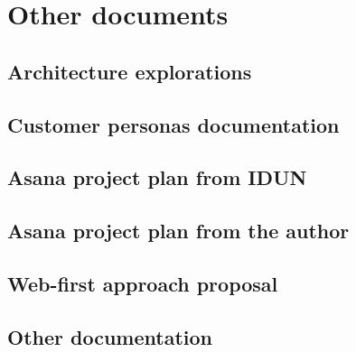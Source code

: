 \chapter{Other documents}
\label{appendix6-other-documents}

\section*{Architecture explorations}

\section*{Customer personas documentation}

\section*{Asana project plan from IDUN}

\section*{Asana project plan from the author}

\section*{Web-first approach proposal}

\section*{Other documentation}